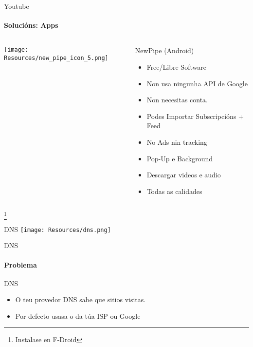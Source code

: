 \documentclass{beamer}
\begin{document}
\begin{frame}{Youtube}
  \framesubtitle{Solucións: Apps}

  \begin{columns}
    \begin{column}{0.5\textwidth}
      \texttt{[image: Resources/new\_pipe\_icon\_5.png]}

      \vspace{1cm}


    \end{column}

    \begin{column}{0.4\textwidth}
      \begin{block}{NewPipe (Android)}
        \begin{itemize}
          \item Free/Libre Software
          \item Non usa ningunha API de Google
          \item Non necesitas conta.
          \item Podes Importar Subscripcións + Feed
          \item No Ads nin tracking
          \item Pop-Up e Background
          \item Descargar videos e audio
          \item Todas as calidades

        \end{itemize}
      \end{block}

    \end{column}

  \end{columns}


  \footnote{Instalase en F-Droid}

\end{frame}


\begin{frame}{DNS}
  \texttt{[image: Resources/dns.png]}

\end{frame}


\begin{frame}{DNS}
  \framesubtitle{Problema}

  \begin{block}{DNS}
    \begin{itemize}
      \item O teu provedor DNS sabe que sitios visitas.
      \item Por defecto usasa o da túa ISP ou Google
    \end{itemize}
  \end{block}

\end{frame}
\end{document}

